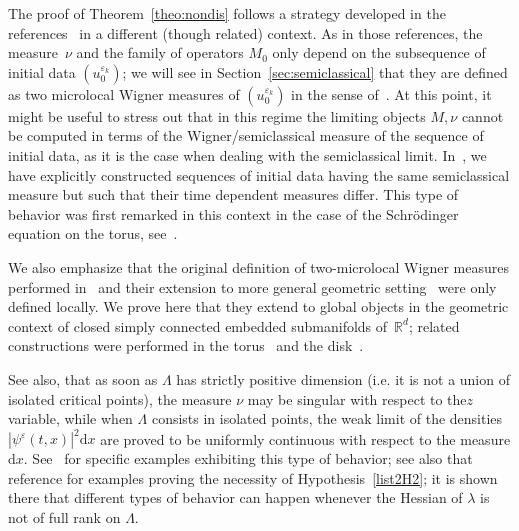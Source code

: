 \documentclass[AHL,Unicode,longabstracts]{cedram}
\newcommand*\R{{\mathbb R}}
\newcommand*\eps{\varepsilon}
\numberwithin{equation}{section}
\newcommand*{\dd}{\mathrm{d}}
\newcommand*{\dx}{\dd x}
\begin{document}


The proof of Theorem~\ref{theo:nondis} follows a strategy developed in the references~\cite{AFM:15,AM:12,MaciaTorus} in a different (though related) context. As in those references, the measure~$\nu$ and the family of operators $M_0$ only depend on the subsequence of initial data $(u^{\eps_k}_0)$; we will see in Section~\ref{sec:semiclassical} that they are defined as two microlocal Wigner measures of $(u^{\eps_k}_0)$ in the sense of~\cite{Fethese95,F2micro:00,F2micro:05,MaciaTorus}. At this point, it might be useful to stress out that in this regime the limiting objects $M,\nu$ cannot be computed in terms of the Wigner/semiclassical measure of the sequence of initial data, as it is the case when dealing with the semiclassical limit. In~\cite{CFMProc}, we have explicitly constructed sequences of initial data having the same semiclassical measure but such that their time dependent measures differ. This type of behavior was first remarked in this context in the case of the Schr\"odinger equation on the torus, see~\cite{MaciaAv,MaciaTorus}.


We also emphasize that the original definition of two-microlocal Wigner measures performed in~\cite{F2micro:00} and their extension to more general geometric setting~\cite{F2micro:05} were only defined locally. We prove here that they extend to global objects in the geometric context of closed simply connected embedded submanifolds of~$\R^d$; related constructions were performed in the torus~\cite{AFM:15,AM:12,MaciaTorus,MR:18} and the disk~\cite{ALM:16}.



See also, that as soon as $\Lambda$ has strictly positive dimension (i.e. it is not a union of isolated critical points), the measure $\nu$ may be singular with respect to the\linebreak $z$ variable, while when $\Lambda$ consists in isolated points, the weak limit of the densities $|\psi^\eps(t,x)|^2\dx$ are proved to be uniformly continuous with respect to the measure $\dx$. See~\cite{CFMProc} for specific examples exhibiting this type of behavior; see also that reference for examples proving the necessity of Hypothesis~\eqref{list2H2}; it is shown there that different types of behavior can happen whenever the Hessian of $\lambda$ is not of full rank on $\Lambda$.

\end{document}
